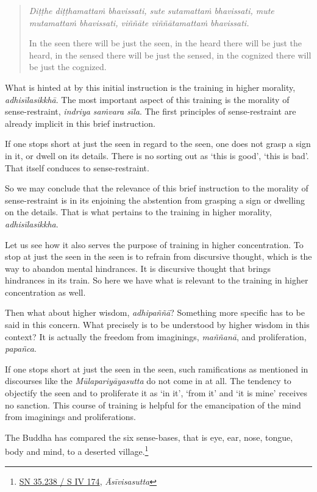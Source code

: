 \begin{quote}
\emph{Diṭṭhe diṭṭhamattaṁ bhavissati, sute sutamattaṁ bhavissati, mute mutamattaṁ bhavissati, viññāte viññātamattaṁ bhavissati.}

In the seen there will be just the seen, in the heard there will be just the heard, in the sensed there will be just the sensed, in the cognized there will be just the cognized.
\end{quote}

What is hinted at by this initial instruction is the training in higher morality, \emph{adhisīlasikkhā}. The most important aspect of this training is the morality of sense-restraint, \emph{indriya saṁvara sīla}. The first principles of sense-restraint are already implicit in this brief instruction.

If one stops short at just the seen in regard to the seen, one does not grasp a sign in it, or dwell on its details. There is no sorting out as `this is good', `this is bad'. That itself conduces to sense-restraint.

So we may conclude that the relevance of this brief instruction to the morality of sense-restraint is in its enjoining the abstention from grasping a sign or dwelling on the details. That is what pertains to the training in higher morality, \emph{adhisīlasikkha}.

Let us see how it also serves the purpose of training in higher concentration. To stop at just the seen in the seen is to refrain from discursive thought, which is the way to abandon mental hindrances. It is discursive thought that brings hindrances in its train. So here we have what is relevant to the training in higher concentration as well.

Then what about higher wisdom, \emph{adhipaññā}? Something more specific has to be said in this concern. What precisely is to be understood by higher wisdom in this context? It is actually the freedom from imaginings, \emph{maññanā}, and proliferation, \emph{papañca}.

If one stops short at just the seen in the seen, such ramifications as mentioned in discourses like the \emph{Mūlapariyāyasutta} do not come in at all. The tendency to objectify the seen and to proliferate it as `in it', `from it' and `it is mine' receives no sanction. This course of training is helpful for the emancipation of the mind from imaginings and proliferations.

The Buddha has compared the six sense-bases, that is eye, ear, nose, tongue, body and mind, to a deserted village.\footnote{\href{https://suttacentral.net/sn35.238/pli/ms}{SN 35.238 / S IV 174}, \emph{Āsīvisasutta}}

